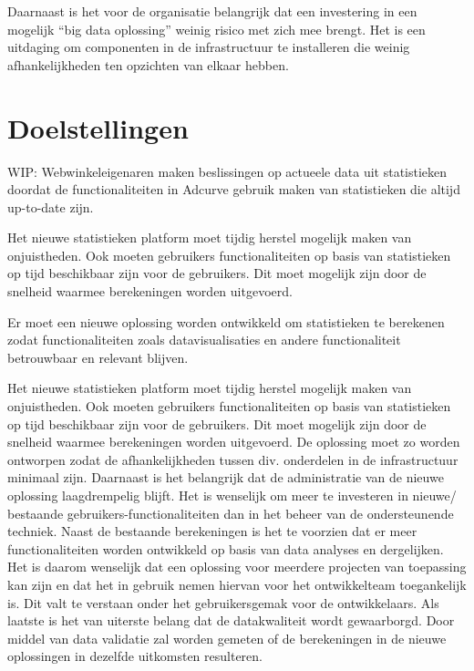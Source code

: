 Daarnaast is het voor de organisatie belangrijk dat een investering in een mogelijk “big data oplossing” weinig risico met zich mee brengt. Het is een uitdaging om componenten in de infrastructuur te installeren die weinig afhankelijkheden ten opzichten van elkaar hebben.



\section{Doelstellingen} %

WIP: Webwinkeleigenaren maken beslissingen op actueele data uit statistieken doordat de functionaliteiten in Adcurve gebruik maken van statistieken die altijd up-to-date zijn.

Het nieuwe statistieken platform moet tijdig herstel mogelijk maken van onjuistheden. Ook moeten gebruikers functionaliteiten op basis van statistieken op tijd beschikbaar zijn voor de gebruikers. Dit moet mogelijk zijn door de snelheid waarmee berekeningen worden uitgevoerd.

Er moet een nieuwe oplossing worden ontwikkeld om statistieken te berekenen zodat functionaliteiten zoals datavisualisaties en andere functionaliteit betrouwbaar en relevant blijven.

Het nieuwe statistieken platform moet tijdig herstel mogelijk maken van onjuistheden. Ook moeten gebruikers functionaliteiten op basis van statistieken op tijd beschikbaar zijn voor de gebruikers. Dit moet mogelijk zijn door de snelheid waarmee berekeningen worden uitgevoerd.
De oplossing moet zo worden ontworpen zodat de afhankelijkheden tussen div. onderdelen in de infrastructuur minimaal zijn.
Daarnaast is het belangrijk dat de administratie van de nieuwe oplossing laagdrempelig blijft. Het is wenselijk om meer te investeren in nieuwe/ bestaande gebruikers-functionaliteiten dan in het beheer van de ondersteunende techniek.
Naast de bestaande berekeningen is het te voorzien dat er meer functionaliteiten worden ontwikkeld op basis van data analyses en dergelijken. Het is daarom wenselijk dat een oplossing voor meerdere projecten van toepassing kan zijn en dat het in gebruik nemen hiervan voor het ontwikkelteam toegankelijk is. Dit valt te verstaan onder het gebruikersgemak voor de ontwikkelaars.
Als laatste is het van uiterste belang dat de datakwaliteit wordt gewaarborgd. Door middel van data validatie zal worden gemeten of de berekeningen in de nieuwe oplossingen in dezelfde uitkomsten resulteren.


